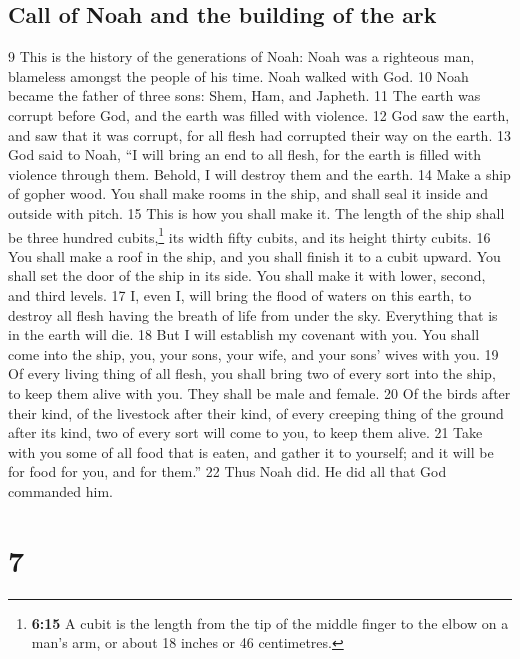 \hypertarget{call-of-noah-and-the-building-of-the-ark}{%
\subsection{Call of Noah and the building of the
ark}\label{call-of-noah-and-the-building-of-the-ark}}

{9} This is the history of the generations of Noah: Noah was a righteous
man, blameless amongst the people of his time. Noah walked with God.
{10} Noah became the father of three sons: Shem, Ham, and Japheth. {11}
The earth was corrupt before God, and the earth was filled with
violence. {12} God saw the earth, and saw that it was corrupt, for all
flesh had corrupted their way on the earth. {13} God said to Noah, ``I
will bring an end to all flesh, for the earth is filled with violence
through them. Behold, I will destroy them and the earth. {14} Make a
ship of gopher wood. You shall make rooms in the ship, and shall seal it
inside and outside with pitch. {15} This is how you shall make it. The
length of the ship shall be three hundred cubits,\footnote{\textbf{6:15}
  A cubit is the length from the tip of the middle finger to the elbow
  on a man's arm, or about 18 inches or 46 centimetres.} its width fifty
cubits, and its height thirty cubits. {16} You shall make a roof in the
ship, and you shall finish it to a cubit upward. You shall set the door
of the ship in its side. You shall make it with lower, second, and third
levels. {17} I, even I, will bring the flood of waters on this earth, to
destroy all flesh having the breath of life from under the sky.
Everything that is in the earth will die. {18} But I will establish my
covenant with you. You shall come into the ship, you, your sons, your
wife, and your sons' wives with you. {19} Of every living thing of all
flesh, you shall bring two of every sort into the ship, to keep them
alive with you. They shall be male and female. {20} Of the birds after
their kind, of the livestock after their kind, of every creeping thing
of the ground after its kind, two of every sort will come to you, to
keep them alive. {21} Take with you some of all food that is eaten, and
gather it to yourself; and it will be for food for you, and for them.''
{22} Thus Noah did. He did all that God commanded him.

\hypertarget{section-6}{%
\section{7}\label{section-6}}

